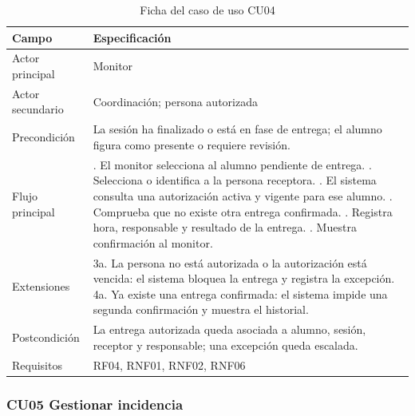 \begin{table}[H]
\centering\small
\begin{tabularx}{\textwidth}{>{\hsize=0.381\hsize\raggedright\arraybackslash}X>{\hsize=1.619\hsize\raggedright\arraybackslash}X}
\toprule
\rowcolor{cabeceratabla} \textbf{Campo} & \textbf{Especificación} \\
\midrule
Actor principal & Monitor \\
Actor secundario & Coordinación; persona autorizada \\
Precondición & La sesión ha finalizado o está en fase de entrega; el alumno figura como presente o requiere revisión. \\
Flujo principal & 1. El monitor selecciona al alumno pendiente de entrega. \newline 2. Selecciona o identifica a la persona receptora. \newline 3. El sistema consulta una autorización activa y vigente para ese alumno. \newline 4. Comprueba que no existe otra entrega confirmada. \newline 5. Registra hora, responsable y resultado de la entrega. \newline 6. Muestra confirmación al monitor. \\
Extensiones & 3a. La persona no está autorizada o la autorización está vencida: el sistema bloquea la entrega y registra la excepción. \newline 4a. Ya existe una entrega confirmada: el sistema impide una segunda confirmación y muestra el historial. \\
Postcondición & La entrega autorizada queda asociada a alumno, sesión, receptor y responsable; una excepción queda escalada. \\
Requisitos & RF04, RNF01, RNF02, RNF06 \\
\bottomrule
\end{tabularx}
\caption{Ficha del caso de uso CU04}\label{tab:28}
\end{table}

\subsubsection{CU05 Gestionar incidencia}\label{sec:4-1-2-5}

